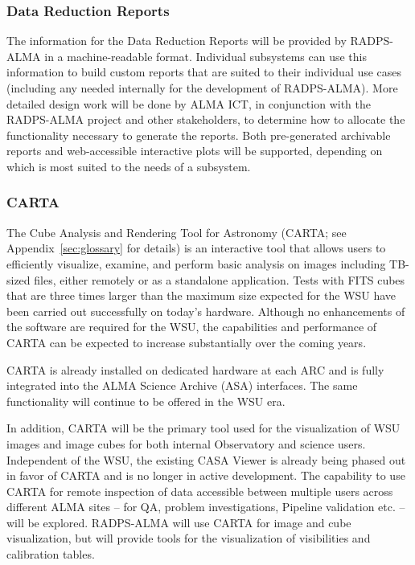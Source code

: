 \subsubsection{Data Reduction Reports}\label{subsec:data_red_report}

The information for the Data Reduction Reports will be provided by RADPS-ALMA in a machine-readable format. Individual subsystems can use this information to build custom reports that are suited to their individual use cases (including any needed internally for the development of RADPS-ALMA). More detailed design work will be done by ALMA ICT, in conjunction with the RADPS-ALMA project and other stakeholders, to determine how to allocate the functionality necessary to generate the reports. Both pre-generated archivable reports and web-accessible interactive plots will be supported, depending on which is most suited to the needs of a subsystem. 

\subsubsection{CARTA}
\label{sec:carta}
The Cube Analysis and Rendering Tool for Astronomy (CARTA; see Appendix~\ref{sec:glossary} for details) is an interactive tool that allows users to efficiently visualize, examine, and perform basic analysis on images including TB-sized files, either remotely or as a standalone application. Tests with FITS cubes that are three times larger than the maximum size expected for the WSU have been carried out successfully on today’s hardware. Although no enhancements of the software are required for the WSU, the capabilities and performance of CARTA can be expected to increase substantially over the coming years.

CARTA is already installed on dedicated hardware at each ARC and is fully integrated into the ALMA Science Archive (ASA) interfaces. The same functionality will continue to be offered in the WSU era.


In addition, CARTA will be the primary tool used for the visualization of WSU images and image cubes for both internal Observatory and science users. Independent of the WSU, the existing CASA Viewer is already being phased out in favor of CARTA and is no longer in active development. The capability to use CARTA for remote inspection of data accessible between multiple users across different ALMA sites -- for \ac{QA}, problem investigations, Pipeline validation etc. -- will be explored. RADPS-ALMA will use CARTA for image and cube visualization, but will provide tools for the visualization of visibilities and calibration tables.


